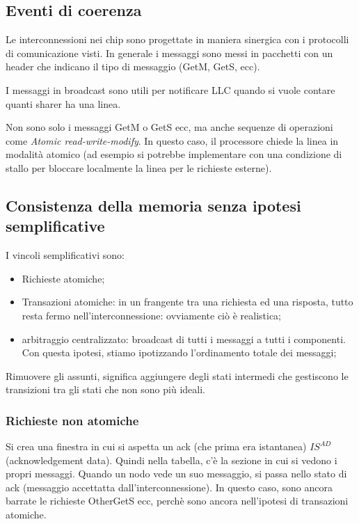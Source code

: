 \documentclass{article}
\begin{document}
\subsection{Eventi di coerenza}
Le interconnessioni nei chip sono progettate in maniera sinergica con i protocolli di comunicazione visti. In generale i messaggi sono messi in pacchetti con un header che indicano il tipo di messaggio (GetM, GetS, ecc).

I messaggi in broadcast sono utili per notificare LLC quando si vuole contare quanti sharer ha una linea.

Non sono solo i messaggi GetM o GetS ecc, ma anche sequenze di operazioni come \textit{Atomic read-write-modify}. In questo caso, il processore chiede la linea in modalità atomico (ad esempio si potrebbe implementare con una condizione di stallo per bloccare localmente la linea per le richieste esterne).

\subsection{Consistenza della memoria senza ipotesi semplificative}
I vincoli semplificativi sono:
\begin{itemize}
    \item Richieste atomiche;
    \item Transazioni atomiche: in un frangente tra una richiesta ed una risposta, tutto resta fermo nell'interconnessione: ovviamente ciò è realistica;
    \item arbitraggio centralizzato: broadcast di tutti i messaggi a tutti i componenti. Con questa ipotesi, stiamo ipotizzando l'ordinamento totale dei messaggi;
\end{itemize}

Rimuovere gli assunti, significa aggiungere degli stati intermedi che gestiscono le transizioni tra gli stati che non sono più ideali.

\subsubsection{Richieste non atomiche}
Si crea una finestra in cui si aspetta un ack (che prima era istantanea) $IS^{AD}$ (acknowledgement data). Quindi nella tabella, c'è la sezione in cui si vedono i propri messaggi. Quando un nodo vede un suo messaggio, si passa nello stato di ack (messaggio accettatta dall'interconnessione). In questo caso, sono ancora barrate le richieste OtherGetS ecc, perchè sono ancora nell'ipotesi di transazioni atomiche.
\end{document}
